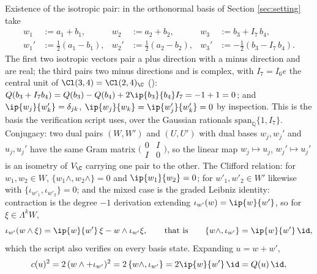 Existence of the isotropic pair: in the orthonormal basis of Section \ref{sec:setting} take
\begin{align*}
w_1 &:= a_1 + b_1, & w_2 &:= a_2 + b_2, & w_3 &:= b_3 + I_7\,b_4,\\
w_1' &:= \tfrac12(a_1 - b_1), & w_2' &:= \tfrac12(a_2 - b_2), & w_3' &:= -\tfrac12(b_3 - I_7\,b_4).
\end{align*}
The first two isotropic vectors pair a plus direction with a minus direction and are real; the third pairs two minus directions and is complex, with $I_7 = I_6e$ the central unit of $\Cl(3,4) = \Cl(2,4)_\C$ (): $Q(b_3 + I_7b_4) = Q(b_3) - Q(b_4) + 2\ip{b_3}{b_4}I_7 = -1 + 1 = 0$; and $\ip{w_j}{w_k'} = \delta_{jk}$, $\ip{w_j}{w_k} = \ip{w_j'}{w_k'} = 0$ by inspection. This is the basis the verification script uses, over the Gaussian rationals $\mathrm{span}_{\mathbb{Q}}\{1, I_7\}$. Conjugacy: two dual pairs $(W, W')$ and $(U, U')$ with dual bases $w_j, w_j'$ and $u_j, u_j'$ have the same Gram matrix $\bigl(\begin{smallmatrix} 0 & I \\ I & 0\end{smallmatrix}\bigr)$, so the linear map $w_j \mapsto u_j$, $w_j' \mapsto u_j'$ is an isometry of $V_\C$ carrying one pair to the other. The Clifford relation: for $w_1, w_2 \in W$, $\{w_1\wedge, w_2\wedge\} = 0$ and $\ip{w_1}{w_2} = 0$; for $w'_1, w'_2 \in W'$ likewise with $\{\iota_{w'_1}, \iota_{w'_2}\} = 0$; and the mixed case is the graded Leibniz identity: contraction is the degree $-1$ derivation extending $\iota_{w'}(w) = \ip{w}{w'}$, so for $\xi \in \Lambda^k W$,
\[
\iota_{w'}(w\wedge\xi) = \ip{w}{w'}\,\xi - w\wedge\iota_{w'}\xi, \qquad\text{that is}\qquad \{w\wedge, \iota_{w'}\} = \ip{w}{w'}\,\id ,
\]
which the script also verifies on every basis state. Expanding $u = w + w'$,
\[
c(u)^2 = 2\,(w\wedge + \iota_{w'})^2 = 2\,\{w\wedge, \iota_{w'}\} = 2\ip{w}{w'}\,\id = Q(u)\,\id ,
\]
